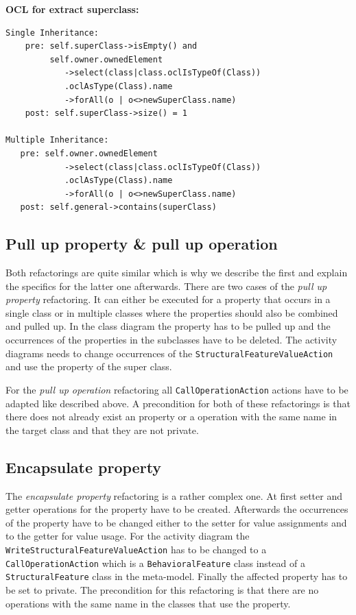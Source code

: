 \documentclass{llncs}
\begin{document}
\textbf{OCL for extract superclass:}
\begin{lstlisting}
Single Inheritance:
    pre: self.superClass->isEmpty() and 
         self.owner.ownedElement
            ->select(class|class.oclIsTypeOf(Class))
            .oclAsType(Class).name
            ->forAll(o | o<>newSuperClass.name)
    post: self.superClass->size() = 1

Multiple Inheritance:
   pre: self.owner.ownedElement
            ->select(class|class.oclIsTypeOf(Class))
            .oclAsType(Class).name
            ->forAll(o | o<>newSuperClass.name)
   post: self.general->contains(superClass)
\end{lstlisting}

\subsection{Pull up property \& pull up operation}
\label{sec:pullup}
Both refactorings are quite similar which is why we describe the first and explain the specifics for the latter one afterwards. 
There are two cases of the \textit{pull up property} refactoring. It can either be executed for a property that occurs in 
a single class or in multiple classes where the properties should also be combined and pulled up. In the class diagram 
the property has to be pulled up and the occurrences of the properties in the subclasses have to be deleted. The 
activity diagrams needs to change occurrences of the \lstinline|StructuralFeatureValueAction| and use the property of 
the super class.

For the \textit{pull up operation} refactoring all \lstinline|CallOperationAction| actions have to be adapted like described 
above. A precondition for both of these refactorings is that there does not already exist an property or a operation with the same name 
in the target class and that they are not private.

\subsection{Encapsulate property}
\label{sec:encapsulate}
The \textit{encapsulate property} refactoring is a rather complex one. At first setter and getter operations for the property have to be 
created. Afterwards the occurrences of the property have to be changed either to the setter for value assignments and to the getter 
for value usage. For the activity diagram the \lstinline|WriteStructuralFeatureValueAction| has to be changed to a 
\lstinline|CallOperationAction| which is a \lstinline|BehavioralFeature| class instead of a \lstinline|StructuralFeature| class in 
the meta-model. Finally the affected property has to be set to private. The precondition for this refactoring is that there are no 
operations with the same name in the classes that use the property.
\end{document}
